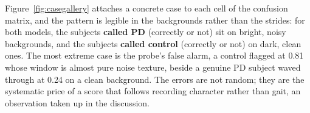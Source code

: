 Figure~\ref{fig:casegallery} attaches a concrete case to each cell of the
confusion matrix, and the pattern is legible in the backgrounds rather than the
strides: for both models, the subjects \textbf{called PD} (correctly or not)
sit on bright, noisy backgrounds, and the subjects \textbf{called control}
(correctly or not) on dark, clean ones. The most extreme case is the
probe's false alarm, a control flagged at 0.81 whose window is almost pure
noise texture, beside a genuine PD subject waved through at 0.24 on a clean
background. The errors are not random; they are the systematic price of a
score that follows recording character rather than gait, an observation
taken up in the discussion.
